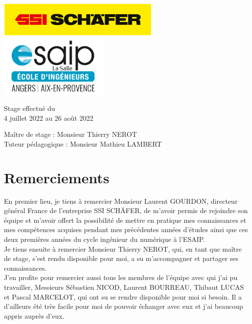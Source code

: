 \documentclass[a4paper, 12pt, french]{article}
\begin{document}
\begin{titlepage}
\begin{center}
			\vfill

			\includegraphics[width=0.6\textwidth]{images/schaefer.jpg}
			\vfill
			\includegraphics[width=0.4\textwidth]{images/esaip.jpg}

			\vfill

			Stage effectué du\\
			4 juillet 2022 au 26 août 2022

			\vspace{0.8cm}
			
			\Large
			Maître de stage : Monsieur Thierry NEROT\\
			Tuteur pédagogique : Monsieur Mathieu LAMBERT\\
		\end{center}
	\end{titlepage}
		
	\newpage

	\section*{Remerciements}		
	En premier lieu, je tiens à remercier Monsieur Laurent GOURDON, directeur général France de l'entreprise SSI SCHÄFER, de m’avoir permis de rejoindre son équipe et m’avoir offert la possibilité de mettre en pratique mes connaissances et mes compétences acquises pendant mes précédentes années d’études ainsi que ces deux premières années du cycle ingénieur du numérique à l’ESAIP. \\

	Je tiens ensuite à remercier Monsieur Thierry NEROT, qui, en tant que maître de stage, s'est rendu disponible pour moi, a su m'accompagner et partager ses connaissances.\\

	J’en profite pour remercier aussi tous les membres de l’équipe avec qui j’ai pu travailler, Messieurs Sébastien NICOD, Laurent BOURREAU, Thibaut LUCAS et Pascal MARCELOT, qui ont su se rendre disponible pour moi si besoin. Il a d'ailleurs été très facile pour moi de pouvoir échanger avec eux et j'ai beaucoup appris auprès d'eux.\\
\end{document}
